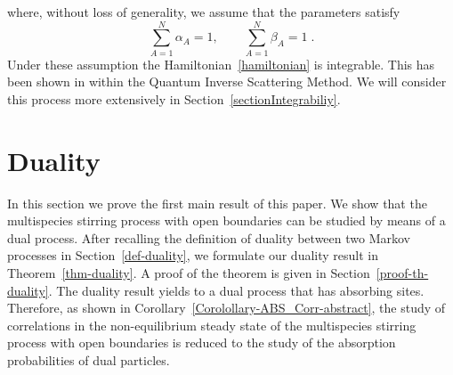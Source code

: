 \documentclass[10pt]{article}
\numberwithin{equation}{section}
\numberwithin{equation}{subsection}
\newcommand{\fra}[1]{\textcolor[rgb]{0,0,1}{#1}}
\begin{document}
where, without loss of generality,  we assume that the parameters satisfy
\begin{equation}\label{ratesConditions}
	\sum_{A=1}^{N}\alpha_{A}=1,\qquad\sum_{A=1}^{N}\beta_{A}=1\;.
\end{equation} 
Under these assumption the Hamiltonian~\ref{hamiltonian} is integrable. This has been \fra{shown} in \cite{vanicat2017exact} within  the Quantum Inverse Scattering Method.  We will consider this process more extensively in Section~\ref{sectionIntegrabiliy}.

\section{Duality}\label{sectionDuality}
In this section we prove the first main result of this paper. We show that the multispecies stirring process with open boundaries
can be studied by means of a dual process. After recalling the definition of duality between two
Markov processes in Section~\ref{def-duality}, we formulate our duality result  in Theorem~\ref{thm-duality}. A proof of the theorem is given in Section~\ref{proof-th-duality}.
The duality result yields {to a dual process that} 
 has absorbing sites. Therefore, as shown in Corollary~\ref{Corolollary-ABS_Corr-abstract}, the study of correlations in the non-equilibrium steady state of the multispecies stirring process with open boundaries
is reduced to the study of the absorption probabilities of dual particles.
\end{document}
